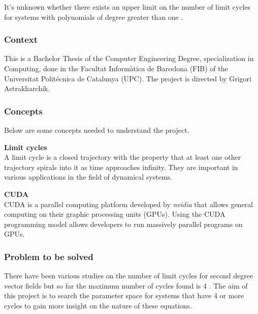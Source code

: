 It's unknown whether there exists an upper limit on the number of limit cycles
for systems with polynomials of degree greater than one
\cite{ilyashenko_centennial_2002}.




\subsubsection{Context}

This is a Bachelor Thesis of the Computer Engineering Degree, specialization in
Computing, done in the Facultat Inform\`atica de Barcelona (FIB) of the
Universitat Polit\'ecnica de Catalunya (UPC). The project is directed by Grigori
Astrakharchik.

\subsubsection{Concepts}

Below are some concepts needed to understand the project.

\newcommand{\concept}[1]{\textbf{#1}\\}


\concept{Limit cycles}
A limit cycle is a closed trajectory with the property that at least one other
trajectory spirals into it as time approaches infinity. They are important in
various applications in the field of dynamical systems.

\concept{CUDA}
CUDA is a parallel computing platform developed by \emph{nvidia} that allows general
computing on their graphic processing units (GPUs). Using the CUDA programming
model allows developers to run massively parallel programs on GPUs.

\subsubsection{Problem to be solved}

There have been various studies on the number of limit cycles for second degree
vector fields but so far the maximum number of cycles found is 4
\cite{kuznetsov_visualization_2013}. The aim of this project is to search the
parameter space for systems that have 4 or more cycles to gain more insight on
the nature of these equations.


